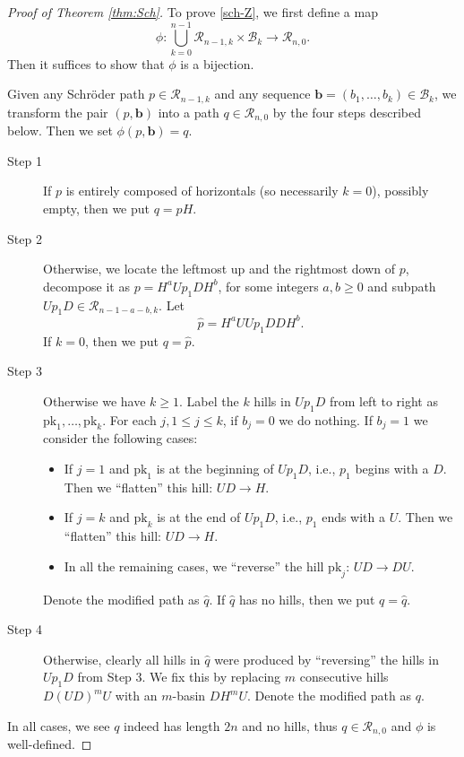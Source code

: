 \documentclass[11pt,reqno]{amsart}
\numberwithin{equation}{section}
\theoremstyle{plain}
\theoremstyle{definition}
\newcommand{\R}{\mathcal{R}}
\newcommand{\B}{\mathcal{B}}
\begin{document}
\begin{proof}[Proof of Theorem \ref{thm:Sch}] To prove \eqref{sch-Z}, we first define a map $$\phi:\bigcup_{k=0}^{n-1}\R_{n-1,k}\times\B_k\rightarrow \R_{n,0}.$$ Then it suffices to show that $\phi$ is a bijection.

Given any Schr\"oder path $p\in\R_{n-1,k}$ and any sequence $\mathbf{b}=(b_1,\dots,b_k)\in\B_k$, we transform the pair $(p,\mathbf{b})$ into a path $q\in\R_{n,0}$ by the four steps described below. Then we set $\phi(p,\mathbf{b})=q$.
\begin{description}
\item[Step 1] If $p$ is entirely composed of horizontals (so necessarily $k=0$), possibly empty, then we put $q=pH$.

\item[Step 2] Otherwise, we locate the leftmost up and the rightmost down of $p$, decompose it as $p=H^aUp_1DH^b$, for some integers $a,b\ge 0$ and subpath $Up_1D\in\R_{n-1-a-b,k}$. Let $$\hat{p}=H^aUUp_1DDH^b.$$ If $k=0$, then we put $q=\hat{p}$.
\item[Step 3] Otherwise we have $k\ge 1$. Label the $k$ hills in $Up_1D$ from left to right as $\mathrm{pk}_1,\ldots,\mathrm{pk}_k$. For each $j,1\le j\le k$, if $b_j=0$ we do nothing. If $b_j=1$ we consider the following cases:
\begin{itemize}
\item If $j=1$ and $\mathrm{pk}_1$ is at the beginning of $Up_1D$, i.e., $p_1$ begins with a $D$. Then we ``flatten'' this hill: $UD\rightarrow H$.
\item If $j=k$ and $\mathrm{pk}_k$ is at the end of $Up_1D$, i.e., $p_1$ ends with a $U$. Then we ``flatten'' this hill: $UD\rightarrow H$.
\item In all the remaining cases, we ``reverse'' the hill $\mathrm{pk}_j$: $UD\rightarrow DU$.
\end{itemize}
Denote the modified path as $\hat{q}$. If $\hat{q}$ has no hills, then we put $q=\hat{q}$.
\item[Step 4] Otherwise, clearly all hills in $\hat{q}$ were produced by ``reversing'' the hills in $Up_1D$ from Step 3. We fix this by replacing $m$ consecutive hills $D(UD)^mU$ with an $m$-basin $DH^mU$. Denote the modified path as $q$.
\end{description}
In all cases, we see $q$ indeed has length $2n$ and no hills, thus $q\in\R_{n,0}$ and $\phi$ is well-defined.


\end{proof}
\end{document}
